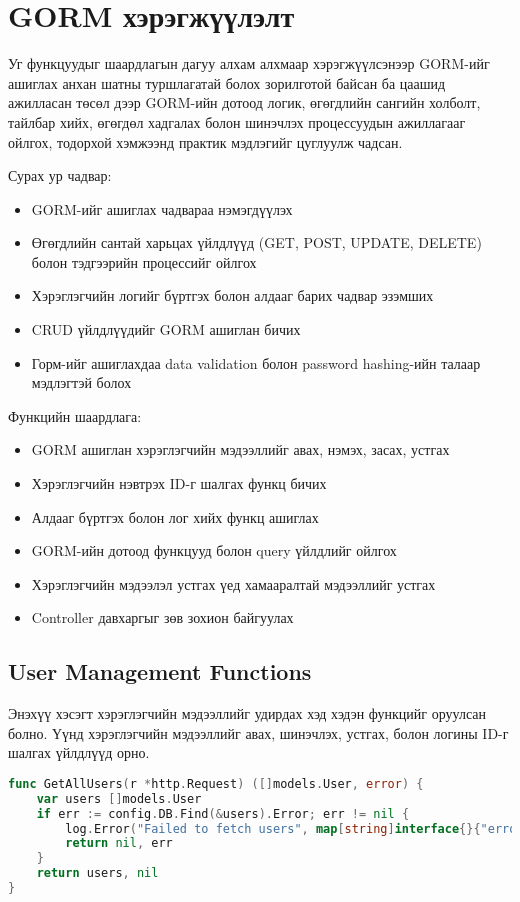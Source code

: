 \section{GORM хэрэгжүүлэлт}

Уг функцуудыг шаардлагын дагуу алхам алхмаар хэрэгжүүлсэнээр GORM-ийг ашиглах анхан шатны туршлагатай болох зорилготой байсан ба цаашид ажилласан төсөл дээр GORM-ийн дотоод логик, өгөгдлийн сангийн холболт, тайлбар хийх, өгөгдөл хадгалах болон шинэчлэх процессуудын ажиллагааг ойлгох, тодорхой хэмжээнд практик мэдлэгийг цуглуулж чадсан.

Сурах ур чадвар: 
\begin{itemize} 
	\item GORM-ийг ашиглах чадвараа нэмэгдүүлэх 
	\item Өгөгдлийн сантай харьцах үйлдлүүд (GET, POST, UPDATE, DELETE) болон тэдгээрийн процессийг ойлгох 
	\item Хэрэглэгчийн логийг бүртгэх болон алдааг барих чадвар эзэмших 
	\item CRUD үйлдлүүдийг GORM ашиглан бичих 
	\item Горм-ийг ашиглахдаа data validation болон password hashing-ийн талаар мэдлэгтэй болох \end{itemize}

Функцийн шаардлага: 
\begin{itemize} 
	\item GORM ашиглан хэрэглэгчийн мэдээллийг авах, нэмэх, засах, устгах 
	\item Хэрэглэгчийн нэвтрэх ID-г шалгах функц бичих 
	\item Алдааг бүртгэх болон лог хийх функц ашиглах 
	\item GORM-ийн дотоод функцууд болон query үйлдлийг ойлгох 
	\item Хэрэглэгчийн мэдээлэл устгах үед хамааралтай мэдээллийг устгах
	\item Controller  давхаргыг зөв зохион байгуулах
\end{itemize}
	
\subsection{User Management Functions}

Энэхүү хэсэгт хэрэглэгчийн мэдээллийг удирдах хэд хэдэн функцийг оруулсан болно. Үүнд хэрэглэгчийн мэдээллийг авах, шинэчлэх, устгах, болон логины ID-г шалгах үйлдлүүд орно.

\begin{lstlisting}[language=Go, caption=Get all users function, frame=single]
func GetAllUsers(r *http.Request) ([]models.User, error) {
	var users []models.User
	if err := config.DB.Find(&users).Error; err != nil {
		log.Error("Failed to fetch users", map[string]interface{}{"error": err.Error()}, r)
		return nil, err
	}
	return users, nil
}
\end{lstlisting}

